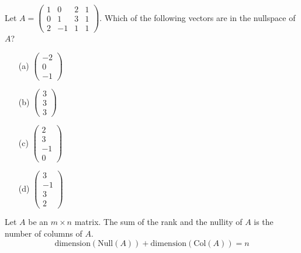 \begin{problem}
    Let $A =
    \left( \begin{array}{cccc}
            1 & 0 & 2 & 1\\
            0 & 1 & 3 & 1\\
        2 & -1 & 1 & 1\end{array} \right).$
    Which of the following vectors are in the nullspace of $A$?

\begin{enumerate}
    \item[(a)]  
        $\left( \begin{array}{c} -2 \\ 0 \\ -1 \end{array} \right)$
    \item[(b)]  
        $\left( \begin{array}{c} 3 \\ 3 \\ 3 \end{array} \right)$
    \item[(c)]  
        $\left( \begin{array}{c} 2 \\ 3 \\ -1 \\ 0 \end{array} \right)$
    \item[(d)]  
        $\left( \begin{array}{c} 3 \\ -1 \\ 3 \\ 2 \end{array} \right)$
\end{enumerate}
\end{problem}
%             



\begin{thm}
    Let $A$ be an $m \times n$ matrix.  The sum of the rank and the nullity of $A$ is the
    number of columns of $A$.
    \[ \text{dimension}(\text{Null}(A)) + \text{dimension}(\text{Col}(A)) = n \]
\end{thm}

